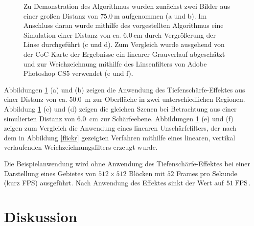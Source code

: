 \documentclass{acmsiggraph}                     %
\begin{document}
\begin{figure}[p]
	\qquad
\caption{Zu Demonstration des Algorithmus wurden zunächst zwei Bilder aus einer großen Distanz von $\SI{75.0}{\meter}$ aufgenommen (a und b). Im Anschluss daran wurde mithilfe des vorgestellten Algorithmus eine Simulation einer Distanz von ca. $\SI{6.0}{\centi\meter}$ durch Vergrößerung der Linse durchgeführt (c und d). Zum Vergleich wurde ausgehend von der CoC-Karte der Ergebnisse ein linearer Grauverlauf abgeschätzt und zur Weichzeichnung mithilfe des Linsenfilters von Adobe Photoshop CS5 verwendet (e und f).}
	\label{abb:res}
\end{figure}

Abbildungen \ref{abb:res} (a) und (b) zeigen die Anwendung des Tiefenschärfe-Effektes aus einer Distanz von ca. \SI{50.0}{\meter} zur Oberfläche in zwei unterschiedlichen Regionen. Abbildung \ref{abb:res} (c) und (d) zeigen die gleichen Szenen bei Betrachtung aus einer simulierten Distanz von \SI{6.0}{\centi\meter} zur Schärfeebene. Abbildungen \ref{abb:res} (e) und (f) zeigen zum Vergleich die Anwendung eines linearen Unschärfefilters, der nach dem in Abbildung \ref{flickr} gezeigten Verfahren mithilfe eines linearen, vertikal verlaufenden Weichzeichnungsfilters erzeugt wurde.

Die Beispielanwendung wird ohne Anwendung des Tiefenschärfe-Effektes bei einer Darstellung eines Gebietes von $512 \times 512$ Blöcken mit $52$ Frames pro Sekunde (kurz FPS) ausgeführt. Nach Anwendung des Effektes sinkt der Wert auf $51\;\textnormal{FPS}$.

\section{Diskussion}
\end{document}
